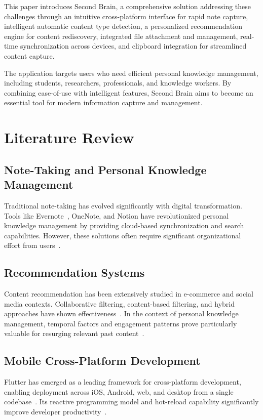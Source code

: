 \documentclass[10pt,twocolumn,a4paper]{article}
\begin{document}
This paper introduces Second Brain, a comprehensive solution addressing these challenges
through an intuitive cross-platform interface for rapid note capture, intelligent automatic
content type detection, a personalized recommendation engine for content rediscovery,
integrated file attachment and management, real-time synchronization across devices, and
clipboard integration for streamlined content capture.

The application targets users who need efficient personal knowledge management, including
students, researchers, professionals, and knowledge workers. By combining ease-of-use with
intelligent features, Second Brain aims to become an essential tool for modern information
capture and management.

\section{Literature Review}

\subsection{Note-Taking and Personal Knowledge Management}

Traditional note-taking has evolved significantly with digital transformation. Tools like
Evernote~\cite{evernote2023}, OneNote, and Notion have revolutionized personal knowledge
management by providing cloud-based synchronization and search capabilities. However, these
solutions often require significant organizational effort from users~\cite{guseva2015}.

\subsection{Recommendation Systems}

Content recommendation has been extensively studied in e-commerce and social media contexts.
Collaborative filtering, content-based filtering, and hybrid approaches have shown
effectiveness~\cite{ricci2011recommender}. In the context of personal knowledge management,
temporal factors and engagement patterns prove particularly valuable for resurging relevant
past content~\cite{nakamura2008}.

\subsection{Mobile Cross-Platform Development}

Flutter has emerged as a leading framework for cross-platform development, enabling deployment
across iOS, Android, web, and desktop from a single codebase~\cite{flutter2023}. Its reactive
programming model and hot-reload capability significantly improve developer
productivity~\cite{tang2021}.
\end{document}
